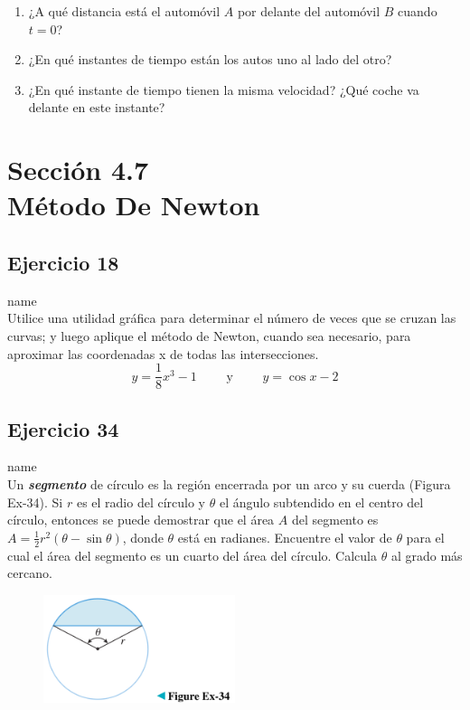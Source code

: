 \documentclass[12pt]{article}
\begin{document}
\begin{enumerate}[label=(\alph*)]
\item ¿A qué distancia está el automóvil $A$ por delante del automóvil $B$ cuando $t = 0$?
\item ¿En qué instantes de tiempo están los autos uno al lado del otro?
\item ¿En qué instante de tiempo tienen la misma velocidad? ¿Qué coche va delante en este instante?
\end{enumerate}

\section{Sección 4.7 \\ Método De Newton}
\subsection{Ejercicio 18} name \\

Utilice una utilidad gráfica para determinar el número de veces que se cruzan las curvas; y luego aplique el método de Newton, cuando sea necesario, para aproximar las coordenadas x de todas las intersecciones.
\[
y=\frac{1}{8}x^3-1 \qquad \text{ y } \qquad y=\cos{x}-2
\]

\subsection{Ejercicio 34} name \\

Un \textit{\textbf{segmento}} de círculo es la región encerrada por un arco y su cuerda (Figura Ex-34). Si $r$ es el radio del círculo y $\theta$ el ángulo subtendido en el centro del círculo, entonces se puede demostrar que el área $A$ del segmento es $A = \frac{1}{2} r^2 (\theta - \sin{\theta})$, donde $\theta$ está en radianes. Encuentre el valor de $\theta$ para el cual el área del segmento es un cuarto del área del círculo. Calcula $\theta$ al grado más cercano.

\begin{figure}[H]
\centering
\includegraphics[width=0.5\textwidth]{../img/img_Lista3/3_34.png}
\end{figure}
\end{document}
